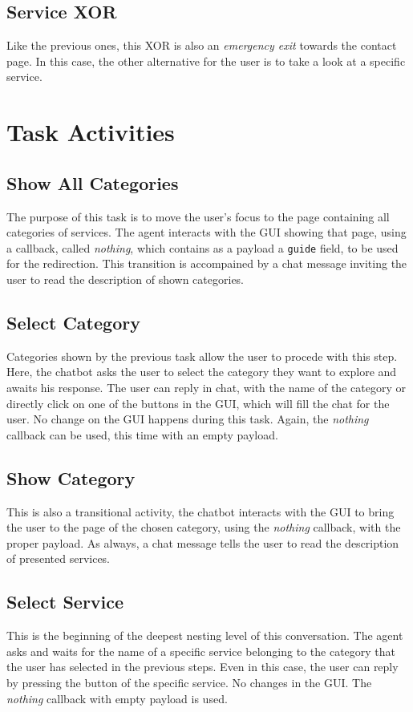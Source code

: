 \documentclass[12pt]{report}
\begin{document}
\subsection{Service XOR}
Like the previous ones, this XOR is also an \emph{emergency exit} towards 
the contact page. In this case, the other alternative for the user is to 
take a look at a specific service.

\section{Task Activities}

\subsection{Show All Categories}
The purpose of this task is to move the user's focus to the page containing 
all categories of services. 
The agent interacts with the GUI showing that page, using a callback,
called \emph{nothing}, which contains as a payload a \texttt{guide} field, to
be used for the redirection.
This transition is accompained by a chat message inviting the user to read 
the description of shown categories.

\subsection{Select Category}
Categories shown by the previous task allow the user to procede with this step.
Here, the chatbot asks the user to select the category they want to explore
and awaits his response.
The user can reply in chat, with the name of the category or directly click on one 
of the buttons in the GUI, which will fill the chat for the user.
No change on the GUI happens during this task. Again, the \emph{nothing} callback can 
be used, this time with an empty payload.

\subsection{Show Category}
This is also a transitional activity, the chatbot interacts with the GUI to 
bring the user to the page of the chosen category, using the \emph{nothing} callback, 
with the proper payload. As always, a chat message tells the user to read the description 
of presented services.

\subsection{Select Service}
This is the beginning of the deepest nesting level of this conversation.
The agent asks and waits for the name of a specific service belonging to the 
category that the user has selected in the previous steps.
Even in this case, the user can reply by pressing the button of the specific
service. No changes in the GUI. The \emph{nothing} callback with empty payload
is used.
\end{document}
